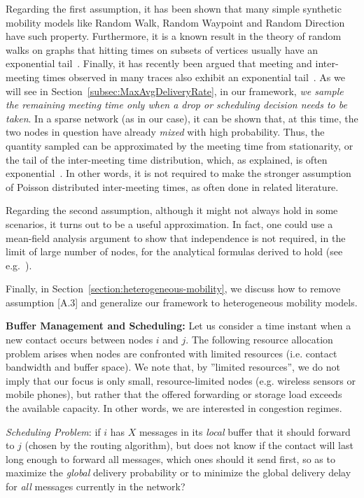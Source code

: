 Regarding the first assumption, it has been shown that many simple synthetic mobility models like Random Walk, Random Waypoint and Random Direction~\cite{akis:mobihoc06,Inria:MessageDelay} have such property. Furthermore, it is a known result in the theory of random walks on graphs that hitting times on subsets of vertices usually have an exponential tail~\cite{Aldous:book}. Finally, it has recently been argued that meeting and inter-meeting times observed in many traces also exhibit an exponential tail~\cite{LeBoudec:Mobicom07}. As we will see in Section~\ref{subsec:MaxAvgDeliveryRate}, in our framework, \emph{we sample the remaining meeting time only when a drop or scheduling decision needs to be taken}. In a sparse network (as in our case), it can be shown that, at this time, the two nodes in question have already \emph{mixed} with high probability. Thus, the quantity sampled can be approximated by the meeting time from stationarity, or the tail of the inter-meeting time distribution, which, as explained, is often exponential~\cite{Akis:IJAACS2008}. In other words, it is not required to make the stronger assumption of Poisson distributed inter-meeting times, as often done in related literature.

Regarding the second assumption, although it might not always hold in some scenarios, it turns out to be a useful approximation. In fact, one could use a mean-field analysis argument to show that independence is not required, in the limit of large number of nodes, for the analytical formulas derived to hold (see e.g.~\cite{LeBoudec:Sigmetrics09}).

Finally, in Section~\ref{section:heterogeneous-mobility}, we discuss how to remove assumption [A.3] and generalize our framework to heterogeneous mobility models.


\textbf{Buffer Management and Scheduling:} Let us consider a time instant when a new contact occurs between nodes $i$ and $j$. The following resource allocation problem arises when nodes are confronted with limited resources (i.e. contact bandwidth and buffer space). We note that, by ''limited resources'', we do not imply that our focus is only small, resource-limited nodes (e.g. wireless sensors or mobile phones), but rather that the offered forwarding or storage load exceeds the available capacity. In other words, we are interested in congestion regimes.

\emph{Scheduling Problem}: if $i$ has $X$ messages in its \emph{local} buffer that it should forward to $j$ (chosen by the routing algorithm), but does not know if the contact will last long enough to forward all messages, which ones should it send first, so as to maximize the \emph{global} delivery probability or to minimize the global delivery delay for \emph{all} messages currently in the network?

